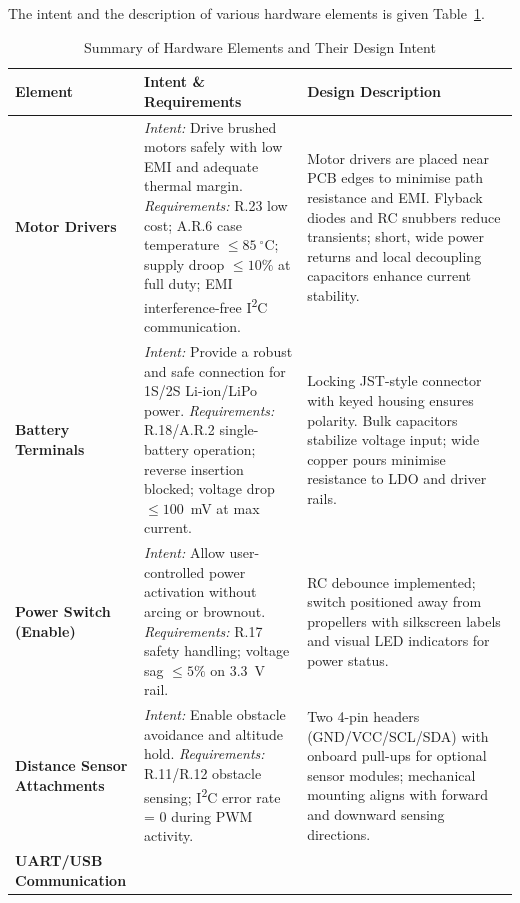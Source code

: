 The intent and the description of various hardware elements is given Table~\ref{tab:hardware-elements}.

\pagebreak

\begin{longtable}{@{}p{2cm} p{6.9cm} p{6.9cm}@{}}
\caption{Summary of Hardware Elements and Their Design Intent}
\label{tab:hardware-elements} \\
\toprule
\textbf{Element} & \textbf{Intent \& Requirements} & \textbf{Design Description} \\ 
\midrule
\textbf{Motor Drivers} &
\textit{Intent:} Drive brushed motors safely with low EMI and adequate thermal margin. \newline
\textit{Requirements:} R.23 low cost; A.R.6 case temperature $\leq 85~^{\circ}$C; supply droop $\leq 10\%$ at full duty; EMI interference-free I\textsuperscript{2}C communication. &
Motor drivers are placed near PCB edges to minimise path resistance and EMI. Flyback diodes and RC snubbers reduce transients; short, wide power returns and local decoupling capacitors enhance current stability. \\ 
\midrule
\textbf{Battery Terminals} &
\textit{Intent:} Provide a robust and safe connection for 1S/2S Li-ion/LiPo power. \newline
\textit{Requirements:} R.18/A.R.2 single-battery operation; reverse insertion blocked; voltage drop $\leq 100$~mV at max current. &
Locking JST-style connector with keyed housing ensures polarity. Bulk capacitors stabilize voltage input; wide copper pours minimise resistance to LDO and driver rails. \\ 
\midrule
\textbf{Power Switch (Enable)} &
\textit{Intent:} Allow user-controlled power activation without arcing or brownout. \newline
\textit{Requirements:} R.17 safety handling; voltage sag $\leq 5\%$ on 3.3~V rail. &
RC debounce implemented; switch positioned away from propellers with silkscreen labels and visual LED indicators for power status. \\ 
\midrule
\textbf{Distance Sensor Attachments} &
\textit{Intent:} Enable obstacle avoidance and altitude hold. \newline
\textit{Requirements:} R.11/R.12 obstacle sensing; I\textsuperscript{2}C error rate = 0 during PWM activity. &
Two 4-pin headers (GND/VCC/SCL/SDA) with onboard pull-ups for optional sensor modules; mechanical mounting aligns with forward and downward sensing directions. \\ 
\midrule
\textbf{UART/USB Communication} &

\end{longtable}
